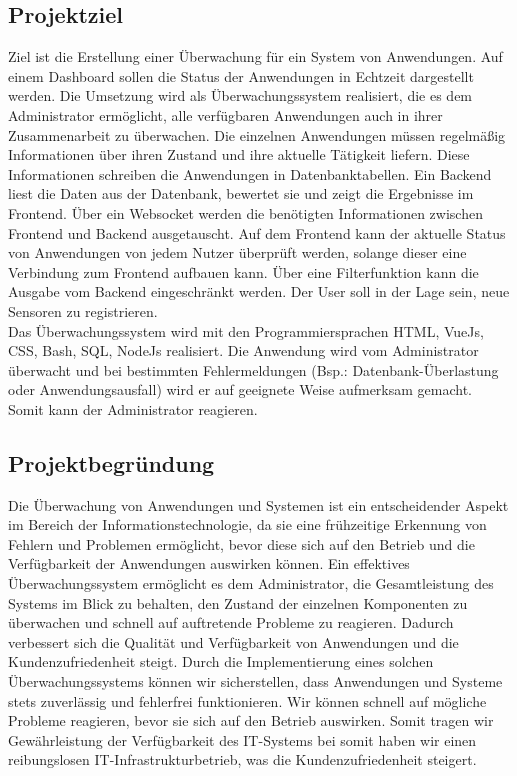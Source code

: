 \begin{flushleft}
\subsection{Projektziel}
Ziel ist die Erstellung einer Überwachung für ein System von Anwendungen. Auf einem Dashboard sollen die Status der Anwendungen in Echtzeit dargestellt werden.
Die Umsetzung wird als Überwachungssystem realisiert, die es dem Administrator ermöglicht, alle verfügbaren Anwendungen auch in ihrer Zusammenarbeit zu überwachen.
Die einzelnen Anwendungen müssen regelmäßig Informationen über ihren Zustand und ihre aktuelle Tätigkeit liefern. Diese Informationen schreiben die Anwendungen in Datenbanktabellen.
Ein Backend liest die Daten aus der Datenbank, bewertet sie und zeigt die Ergebnisse im Frontend. Über ein Websocket werden die benötigten Informationen zwischen Frontend und Backend
ausgetauscht. Auf dem Frontend kann der aktuelle Status von Anwendungen von jedem Nutzer überprüft werden, solange dieser eine Verbindung zum Frontend aufbauen kann.
Über eine Filterfunktion kann die Ausgabe vom Backend eingeschränkt werden. Der User soll in der Lage sein, neue Sensoren zu registrieren. \\ Das Überwachungssystem wird mit den Programmiersprachen HTML, VueJs, CSS, Bash, SQL, NodeJs realisiert.
Die Anwendung wird vom Administrator überwacht und bei bestimmten Fehlermeldungen (Bsp.: Datenbank-Überlastung oder Anwendungsausfall) wird er auf geeignete Weise aufmerksam gemacht.
Somit kann der Administrator reagieren.



\subsection{Projektbegründung}
Die Überwachung von Anwendungen und Systemen ist ein entscheidender Aspekt im Bereich der Informationstechnologie,
da sie eine frühzeitige Erkennung von Fehlern und Problemen ermöglicht, bevor diese sich auf den Betrieb und die Verfügbarkeit der Anwendungen auswirken können.
Ein effektives Überwachungssystem ermöglicht es dem Administrator, die Gesamtleistung des Systems im Blick zu behalten,
den Zustand der einzelnen Komponenten zu überwachen und schnell auf auftretende Probleme zu reagieren.
Dadurch verbessert sich die Qualität und Verfügbarkeit von Anwendungen und die Kundenzufriedenheit steigt.
Durch die Implementierung eines solchen Überwachungssystems können wir sicherstellen,
dass Anwendungen und Systeme stets zuverlässig und fehlerfrei funktionieren.
Wir können schnell auf mögliche Probleme reagieren,
bevor sie sich auf den Betrieb auswirken. Somit tragen wir Gewährleistung der Verfügbarkeit des IT-Systems bei somit haben wir einen reibungslosen IT-Infrastrukturbetrieb, was die Kundenzufriedenheit steigert.


\end{flushleft}
